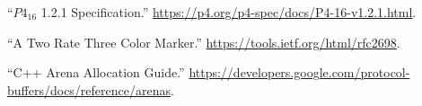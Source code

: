 \documentclass[11pt]{article}
\begin{document}
{%
{%
\begin{thebibliography}{40}%
\label{sec-bibliography}%

\mdbibitemlabel{{}[1]}\textquotedblleft{}$P4_{16}$ 1.2.1 Specification.\textquotedblright{} \href{https://p4.org/p4-spec/docs/P4-16-v1.2.1.html}{{\ttfamily https://\hspace{0pt}p4.\hspace{0pt}org/\hspace{0pt}p4-\hspace{0pt}spec/\hspace{0pt}docs/\hspace{0pt}P4-\hspace{0pt}16-\hspace{0pt}v1.\hspace{0pt}2.\hspace{0pt}1.\hspace{0pt}html}}.\label{p4spec}%

\mdbibitemlabel{{}[2]}\textquotedblleft{}A Two Rate Three Color Marker.\textquotedblright{} \href{https://tools.ietf.org/html/rfc2698}{{\ttfamily https://\hspace{0pt}tools.\hspace{0pt}ietf.\hspace{0pt}org/\hspace{0pt}html/\hspace{0pt}rfc2698}}.\label{rfc2698}%

\mdbibitemlabel{{}[3]}\textquotedblleft{}C++ Arena Allocation Guide.\textquotedblright{} \href{https://developers.google.com/protocol-buffers/docs/reference/arenas}{{\ttfamily https://\hspace{0pt}developers.\hspace{0pt}google.\hspace{0pt}com/\hspace{0pt}protocol-\hspace{0pt}buffers/\hspace{0pt}docs/\hspace{0pt}reference/\hspace{0pt}arenas}}.\label{arenaallocation}%


\end{thebibliography}}}
\end{document}
